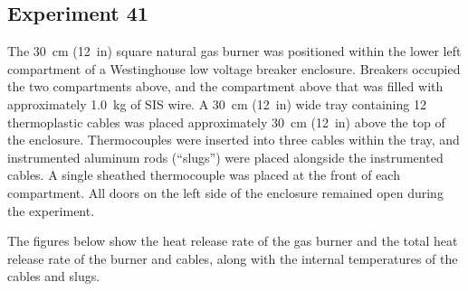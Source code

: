 \documentclass[12pt]{article}
\begin{document}
\subsection{Experiment 41}

The 30~cm (12~in) square natural gas burner was positioned within the lower left compartment of a Westinghouse low voltage breaker enclosure. Breakers occupied the two compartments above, and the compartment above that was filled with approximately 1.0~kg of SIS wire.
A 30~cm (12~in) wide tray containing 12 thermoplastic cables was placed approximately 30~cm (12~in) above the top of the enclosure. Thermocouples were inserted into three cables within the tray, and instrumented aluminum rods (``slugs'') were placed alongside the instrumented cables. A single sheathed thermocouple was placed at the front of each compartment. All doors on the left side of the enclosure remained open during the experiment.

The figures below show the heat release rate of the gas burner and the total heat release rate of the burner and cables, along with the internal temperatures of the cables and slugs.
\end{document}
